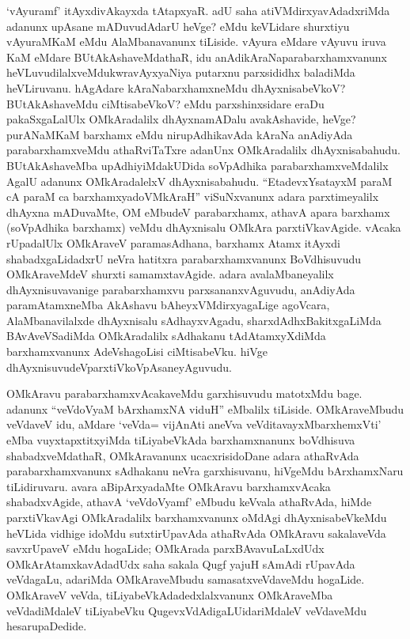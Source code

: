 \begin{artha}
`vAyuramf' itAyxdivAkayxda tAtapxyaR. adU saha atiVMdirxyavAdadxriMda adanunx upAsane mADuvudAdarU heVge? eMdu keVLidare shurxtiyu vAyuraMKaM eMdu AlaMbanavanunx tiLiside. vAyura eMdare vAyuvu iruva KaM eMdare BUtAkAshaveMdathaR, idu anAdikAraNaparabarxhamxvanunx heVLuvudilalxveMdu\break kwravAyxyaNiya putarxnu parxsididhx baladiMda heVLiruvanu. hAgAdare kAraNabarxhamxneMdu dhAyxnisabeVkoV? BUtAkAshaveMdu ciMtisa\-\break beVkoV? eMdu parxshinxsidare eraDu pakaSxgaLalUlx OMkAradalilx dhAyxnamADalu avakAshavide, heVge? purANaMKaM barxhamx eMdu nirupAdhikavAda kAraNa anAdiyAda parabarxhamxveMdu athaRviTaTxre adanUnx OMkAradalilx dhAyxnisabahudu. BUtAkAshaveMba upAdhiyiMda\break kUDida soVpAdhika parabarxhamxveMdalilx AgalU adanunx OMkAradalelxV dhAyxnisabahudu. ``EtadevxYsatayxM paraM cA paraM ca barxhamxyadoVMkAraH'' viSuNxvanunx adara parxtimeyalilx dhAyxna mADuvaMte, OM eMbudeV parabarxhamx, athavA apara barxhamx (soVpAdhika barxhamx) veMdu dhAyxnisalu OMkAra parxtiVkavAgide. vAcaka rUpadalUlx OMkAraveV paramasAdhana, barxhamx Atamx itAyxdi shabadxgaLidadxrU neVra hatitxra parabarxhamxvanunx BoVdhisuvudu OMkAraveMdeV shurxti samamxtavAgide. adara avalaMbaneyalilx dhAyxnisuvavanige parabarxhamxvu parxsananxvAguvudu, anAdiyAda paramAtamxneMba AkAshavu bAheyxVMdirxyagaLige agoVcara, AlaMbanavilalxde dhAyxnisalu sAdhayxvAgadu, sharxdAdhxBakitxgaLiMda BAvAveVSadiMda OMkAradalilx sAdhakanu tAdAtamxyXdiMda barxhamxvanunx AdeVshagoLisi ciMtisabeVku. hiVge dhAyxnisuvudeV\break parxtiVkoVpAsaneyAguvudu.
\end{artha}

\begin{artha}
OMkAravu  parabarxhamxvAcakaveMdu garxhisuvudu matotxMdu bage. adanunx  ``veVdoV\s yaM bArxhamxNA viduH'' eMbalilx tiLiside. OMkAraveMbudu veVdaveV idu, aMdare `veVda= vijAnAti aneVva veVditavayxMbarxhemxVti' eMba vuyxtapxtitxyiMda tiLiyabeVkAda barxhamxnanunx boVdhisuva shabadxveMdathaR, OMkAravanunx ucacxrisidoDane adara athaRvAda parabarxhamxvanunx sAdhakanu neVra garxhisuvanu, hiVgeMdu bArxhamxNaru tiLidiruvaru. avara aBipArxyadaMte OMkAravu barxhamxvAcaka shabadxvAgide, athavA `veVdoV\s yamf' eMbudu keVvala athaRvAda, hiMde parxtiVkavAgi OMkAradalilx barxhamxvanunx oMdAgi dhAyxnisabeVkeMdu heVLida vidhige idoMdu sutxtirUpavAda athaRvAda OMkAravu sakalaveVda savxrUpaveV eMdu hogaLide; OMkArada parxBAvavuLaLxdUdx OMkArAtamxkavAdadUdx saha sakala Qugf yajuH sAmAdi rUpavAda veVdagaLu, adariMda OMkAraveMbudu samasatxveVdaveMdu hogaLide. OMkAraveV veVda, tiLiyabeVkAdadedxlalxvanunx OMkAraveMba veVdadiMdaleV tiLiyabeVku  QugevxVdAdigaLU\break idariMdaleV veVdaveMdu hesarupaDedide.
\end{artha}

